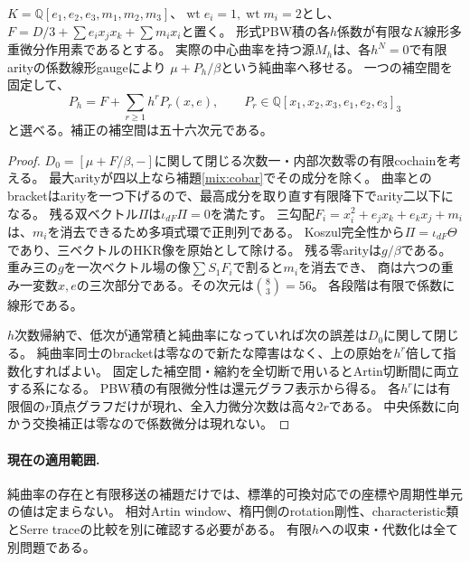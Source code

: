 \begin{proposition}[全次数での純曲率代表]\label{mix:pure}
$K=\mathbb Q[e_1,e_2,e_3,m_1,m_2,m_3]$、$\operatorname{wt}e_i=1,\operatorname{wt}m_i=2$とし、
$F=D/3+\sum e_ix_jx_k+\sum m_ix_i$と置く。
形式PBW積の各$h$係数が有限な$K$線形多重微分作用素であるとする。
実際の中心曲率を持つ源$M_h$は、各$h^N=0$で有限arityの係数線形gaugeにより
$\mu+P_h/\beta$という純曲率へ移せる。
一つの補空間を固定して、
\[
 P_h=F+\sum_{r\ge1}h^rP_r(x,e),\qquad P_r\in\mathbb Q[x_1,x_2,x_3,e_1,e_2,e_3]_3
\]
と選べる。補正の補空間は五十六次元である。
\end{proposition}
\begin{proof}
$D_0=[\mu+F/\beta,-]$に関して閉じる次数一・内部次数零の有限cochainを考える。
最大arityが四以上なら補題\ref{mix:cobar}でその成分を除く。
曲率とのbracketはarityを一つ下げるので、最高成分を取り直す有限降下でarity二以下になる。
残る双ベクトル$\Pi$は$\iota_{dF}\Pi=0$を満たす。
三勾配$F_i=x_i^2+e_jx_k+e_kx_j+m_i$は、$m_i$を消去できるため多項式環で正則列である。
Koszul完全性から$\Pi=\iota_{dF}\Theta$であり、三ベクトルのHKR像を原始として除ける。
残る零arityは$g/\beta$である。
重み三の$g$を一次ベクトル場の像$\sum S_1F_i$で割ると$m_i$を消去でき、
商は六つの重み一変数$x,e$の三次部分である。その次元は$\binom83=56$。
各段階は有限で係数に線形である。

$h$次数帰納で、低次が通常積と純曲率になっていれば次の誤差は$D_0$に関して閉じる。
純曲率同士のbracketは零なので新たな障害はなく、上の原始を$h^r$倍して指数化すればよい。
固定した補空間・縮約を全切断で用いるとArtin切断間に両立する系になる。
PBW積の有限微分性は還元グラフ表示\cite{BW}から得る。
各$h^r$には有限個の$r$頂点グラフだけが現れ、全入力微分次数は高々$2r$である。
中央係数に向かう交換補正は零なので係数微分は現れない。
\end{proof}

\paragraph{現在の適用範囲.}
純曲率の存在と有限移送の補題だけでは、標準的可換対応での座標や周期性単元の値は定まらない。
相対Artin window、楕円側のrotation剛性、characteristic類とSerre traceの比較を別に確認する必要がある。
有限$h$への収束・代数化は全て別問題である。


